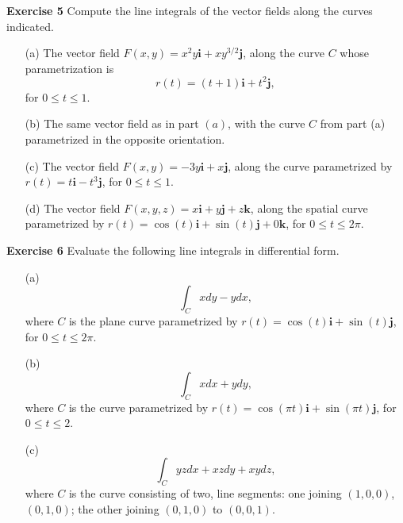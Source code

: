 \documentclass[12pt,oneside]{exam}
\newenvironment{exercise}[1]{\vspace{.1in}\noindent\textbf{Exercise #1 \hspace{.05em}}}{}
\begin{document}
\begin{exercise}{5}
Compute the line integrals of the vector fields along the curves indicated. 
\begin{itemize}
\item[(a)] The vector field $F(x,y)=x^2y \textbf{i} + xy^{3/2}\textbf{j}$, along the curve $C$ whose parametrization is 
\begin{equation*}
r(t)=(t+1)\textbf{i}+t^2\textbf{j},
\end{equation*}
for $0 \leq t \leq 1$. 
\item[(b)] The same vector field as in part $(a)$, with the curve $C$ from part (a) parametrized in the opposite orientation. 
\item[(c)] The vector field $F(x,y)=-3y\textbf{i} + x\textbf{j}$, along the curve parametrized by $r(t)=t\textbf{i} - t^3\textbf{j}$, for $0 \leq t \leq 1$. 
\item[(d)] The vector field $F(x,y,z)=x\textbf{i} + y\textbf{j} + z\textbf{k}$, along the spatial curve parametrized by $r(t)=\cos(t) \textbf{i} + \sin(t) \textbf{j} + 0\textbf{k}$, for $0 \leq t \leq 2\pi$. 
\end{itemize}
\end{exercise}

\begin{exercise}{6}
Evaluate the following line integrals in differential form. 
\begin{itemize}
\item[(a)] 
\begin{equation*}
\int_{C} xdy - ydx, 
\end{equation*}
where $C$ is the plane curve parametrized by $r(t)=\cos(t) \textbf{i} + \sin(t) \textbf{j}$, for $0 \leq t \leq 2\pi$. 
\item[(b)] 
\begin{equation*}
\int_{C} xdx + ydy, 
\end{equation*}
where $C$ is the curve parametrized by $r(t)=\cos(\pi t)\textbf{i} + \sin(\pi t)\textbf{j}$, for $0 \leq t \leq 2$. 
\item[(c)] 
\begin{equation*}
\int_{C} yz dx + xz dy + xy dz,
\end{equation*}
where $C$ is the curve consisting of two, line segments: one joining $(1,0,0)$, $(0,1,0)$; the other joining $(0,1,0)$ to $(0,0,1)$.
\end{itemize}
\end{exercise}
\end{document}
